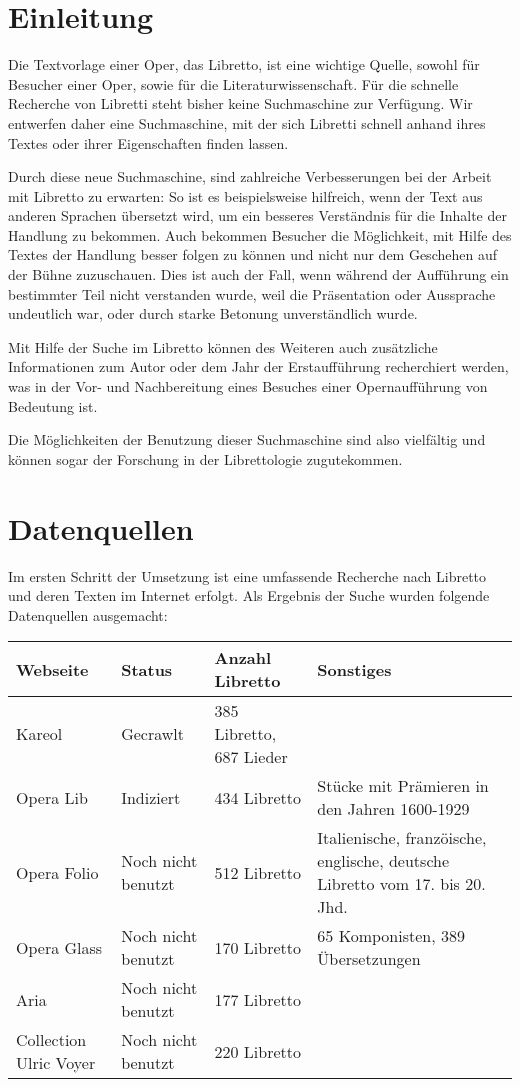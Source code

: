 \section{Einleitung}
Die Textvorlage einer Oper, das Libretto,
ist eine wichtige Quelle, sowohl für Besucher einer Oper,
sowie für die Literaturwissenschaft.
Für die schnelle Recherche von Libretti steht bisher
keine Suchmaschine zur Verfügung.
Wir entwerfen daher eine Suchmaschine, mit der sich Libretti schnell
anhand ihres Textes oder ihrer Eigenschaften finden lassen.

Durch diese neue Suchmaschine, sind zahlreiche Verbesserungen
bei der Arbeit mit Libretto zu erwarten: 
So ist es beispielsweise hilfreich, 
wenn der Text aus anderen Sprachen übersetzt wird, 
um ein besseres Verständnis für die Inhalte der Handlung zu bekommen.
Auch bekommen Besucher die Möglichkeit, 
mit Hilfe des Textes der Handlung besser folgen zu können
und nicht nur dem Geschehen auf der Bühne zuzuschauen.
Dies ist auch der Fall, 
wenn während der Aufführung ein bestimmter Teil nicht verstanden wurde,
weil die Präsentation oder Aussprache undeutlich war,
oder durch starke Betonung unverständlich wurde. 

Mit Hilfe der Suche im Libretto können des Weiteren
auch zusätzliche Informationen zum Autor
oder dem Jahr der Erstaufführung recherchiert werden,
was in der Vor- und Nachbereitung eines Besuches
einer Opernaufführung von Bedeutung ist. 

Die Möglichkeiten der Benutzung dieser Suchmaschine sind also vielfältig
und können sogar der Forschung in der Librettologie zugutekommen.

\section{Datenquellen}
Im ersten Schritt der Umsetzung ist eine umfassende Recherche 
nach Libretto und deren Texten im Internet erfolgt. 
Als Ergebnis der Suche wurden folgende Datenquellen ausgemacht:

\begin{tabular}{l l l l}
    \toprule
    Webseite & Status & Anzahl Libretto & Sonstiges \\
    \midrule
    Kareol & Gecrawlt & 385 Libretto, 687 Lieder & \\
    Opera Lib & Indiziert & 434 Libretto & Stücke mit Prämieren in den Jahren 1600-1929 \\
    Opera Folio & Noch nicht benutzt & 512 Libretto & Italienische, franzöische, englische, deutsche Libretto vom 17. bis 20. Jhd. \\
    Opera Glass & Noch nicht benutzt & 170 Libretto & 65 Komponisten, 389 Übersetzungen \\
    Aria & Noch nicht benutzt & 177 Libretto & \\
    Collection Ulric Voyer & Noch nicht benutzt & 220 Libretto & \\
    \bottomrule
\end{tabular}

